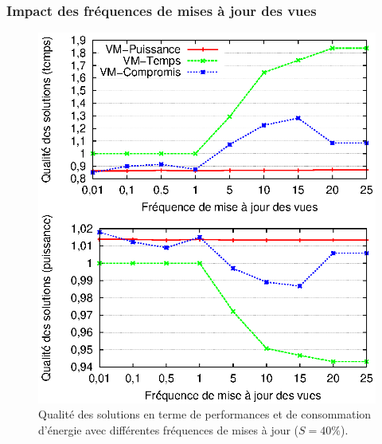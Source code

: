 \subsubsection{Impact des fréquences de mises à jour des vues}\label{subsubsec:ImpactViewsUpdateFrequency}
\begin{figure}
 \centering
 \includegraphics[scale=0.7]{chapitre6/chap6Fig/mv-update-freq.eps}
 \caption{Qualité des solutions en terme de performances et de consommation d'énergie avec différentes fréquences de mises à jour ($S = 40\%$).}
 \label{fig:mv-update-freq}
\end{figure}

